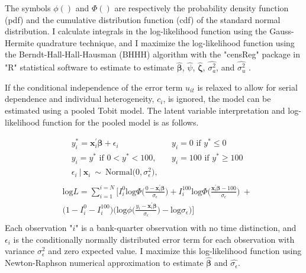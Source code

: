\documentclass[preprint,12pt]{elsarticle}
\begin{document}
The symbols $\phi()$ and  $\Phi()$  are respectively the probability density function (pdf) and 
the cumulative distribution function (cdf) of the standard normal distribution.  I calculate integrals in the log-likelihood function using the Gauss-Hermite quadrature technique, and I maximize the log-likelihood function using the Berndt-Hall-Hall-Hausman (BHHH) algorithm with the "censReg" package in "R" statistical software to estimate to estimate $\bm{\hat{\beta}}$,
$\hat{\psi}$, $\bm{\hat{\zeta}}$, $\hat{\sigma_{a}^{2}}$, and $\hat{\sigma_{u}^{2}}$ \citep{Henningsen2017}.

If the conditional independence of the error term $u_{it}$ is relaxed to allow for serial dependence and individual heterogeneity, $c_{i}$, is ignored, the model can be estimated using a pooled Tobit model.  The latent variable interpretation and log-likelihood function for the pooled model is as follows. 

\begin{align*}
&y_{i}^{*} = \bm{x}_{i}^{'}\bm{\beta} + \epsilon_{i} & &y_{i} = 0 \text{ if } y^{*} \leq 0 \\
&y_{i} = y^{*} \text{ if } 0 < y^{*} < 100, & &y_{i} = 100 \text{ if } y^{*} \geq 100 \\ 
& \epsilon_{i} \ | \ \bm{x}_{i}  \ \sim \ \text{Normal(} 0, \sigma_{\epsilon}^{2} \text{)}, \\
\end{align*}
\begin{align*}
& \textrm{log}L = \sum_{i=1}^{i=N} \bigg[ I_{i}^{0}  \textrm{log}  \Phi \bigg( \frac{0-\bm{x}_{i}^{'}\bm{\beta}}{\sigma_{\epsilon}}\bigg) + I_{i}^{100}  \textrm{log}  \Phi \bigg( \frac{\bm{x}_{i}^{'}\bm{\beta} - 100}{\sigma_{\epsilon}} \bigg) \ + \\
&\bigg( 1 - I_{i}^{0} - I_{i}^{100} \bigg) \bigg( \textrm{log} \phi \bigg( \frac{y_{i} - \bm{x}_{i}^{'}\bm{\beta}}{\sigma_{\epsilon}} \bigg) - \textrm{log} \sigma_{\epsilon} \bigg) \bigg] \\
&
\end{align*}
Each observation "$i$" is a bank-quarter observation with no time distinction, and $\epsilon_{i}$ is the conditionally normally distributed error term for each observation with variance $\sigma_{\epsilon}^{2}$ and zero expected value.  I maximize this log-likelihood function using Newton-Raphson numerical approximation to estimate $\hat{\bm{\beta}}$ and $\hat{\sigma_{\epsilon}}$.
\end{document}
